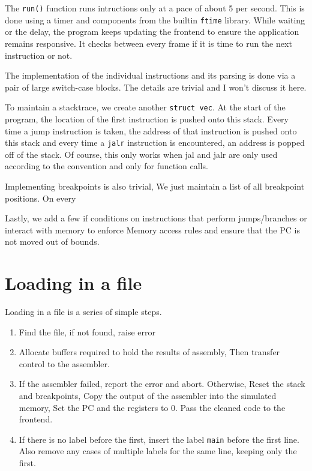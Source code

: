 \documentclass[12pt]{article}
\begin{document}
	The \verb|run()| function runs intructions only at a pace of about 5 per second. This is done using a timer and components from the builtin \verb|ftime| library. While waiting or the delay, the program keeps updating the frontend to ensure the application remains responsive. It checks between every frame if it is time to run the next instruction or not.

	The implementation of the individual instructions and its parsing is done via a pair of large switch-case blocks. The details are trivial and I won't discuss it here.

	To maintain a stacktrace, we create another \verb|struct vec|. At the start of the program, the location of the first instruction is pushed onto this stack.
	Every time a jump instruction is taken, the address of that instruction is pushed onto this stack and every time a \verb|jalr| instruction is encountered, an address is popped off of the stack. Of course, this only works when jal and jalr are only used according to the convention and only for function calls.

	Implementing breakpoints is also trivial, We just maintain a list of all breakpoint positions. On every 

	Lastly, we add a few if conditions on instructions that perform jumps/branches or interact with memory to enforce Memory access rules and ensure that the PC is not moved out of bounds.

	\section{Loading in a file}

	Loading in a file is a series of simple steps.
	
	\begin{enumerate}
		\item Find the file, if not found, raise error
		
		\item Allocate buffers required to hold the results of assembly, Then transfer control to the assembler.
		
		\item If the assembler failed, report the error and abort. Otherwise, Reset the stack and breakpoints, Copy the output of the assembler into the simulated memory, Set the PC and the registers to 0. Pass the cleaned code to the frontend.
		
		\item If there is no label before the first, insert the label \verb|main| before the first line. Also remove any cases of multiple labels for the same line, keeping only the first.
	\end{enumerate}
\end{document}
